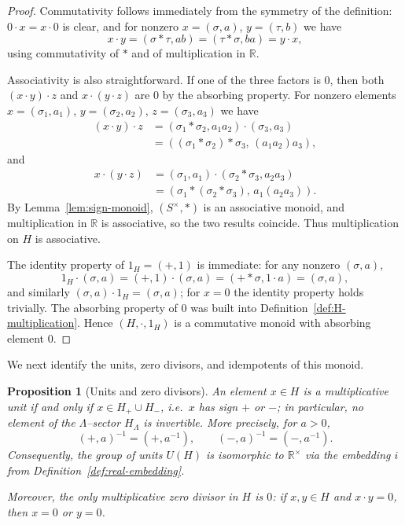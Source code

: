\documentclass[11pt]{amsart}
\numberwithin{equation}{section}
\newtheorem{proposition}[theorem]{Proposition}
\theoremstyle{definition}
\theoremstyle{remark}
\newcommand{\R}{\mathbb{R}}
\newcommand{\Hnum}{H}                      %
\newcommand{\Snon}{S^{\times}}             %
\newcommand{\iemb}{i}                      %
\newcommand{\idH}{1_H}
\begin{document}
\begin{proof}
Commutativity follows immediately from the symmetry of the definition:
$0\cdot x=x\cdot 0$ is clear, and for nonzero $x=(\sigma,a)$,
$y=(\tau,b)$ we have
\[
  x\cdot y = (\sigma*\tau,ab)
           = (\tau*\sigma,ba)
           = y\cdot x,
\]
using commutativity of $*$ and of multiplication in $\R$.

Associativity is also straightforward.  If one of the three factors is
$0$, then both $(x\cdot y)\cdot z$ and $x\cdot(y\cdot z)$ are $0$ by
the absorbing property.  For nonzero elements
$x=(\sigma_1,a_1)$, $y=(\sigma_2,a_2)$, $z=(\sigma_3,a_3)$ we have
\begin{align*}
  (x\cdot y)\cdot z
  &= (\sigma_1*\sigma_2,a_1a_2)\cdot(\sigma_3,a_3)\\
  &= ((\sigma_1*\sigma_2)*\sigma_3,\,(a_1a_2)a_3),
\end{align*}
and
\begin{align*}
  x\cdot(y\cdot z)
  &= (\sigma_1,a_1)\cdot(\sigma_2*\sigma_3,a_2a_3)\\
  &= (\sigma_1*(\sigma_2*\sigma_3),\,a_1(a_2a_3)).
\end{align*}
By Lemma~\ref{lem:sign-monoid}, $(\Snon,*)$ is an associative monoid,
and multiplication in $\R$ is associative, so the two results coincide.
Thus multiplication on $\Hnum$ is associative.

The identity property of $\idH=(+,1)$ is immediate: for any nonzero
$(\sigma,a)$,
\[
  \idH\cdot(\sigma,a)
  = (+,1)\cdot(\sigma,a)
  = (+*\sigma,1\cdot a)
  = (\sigma,a),
\]
and similarly $(\sigma,a)\cdot\idH=(\sigma,a)$; for $x=0$ the identity
property holds trivially.  The absorbing property of $0$ was built
into Definition~\ref{def:H-multiplication}.  Hence $(\Hnum,\cdot,\idH)$
is a commutative monoid with absorbing element $0$.
\end{proof}

We next identify the units, zero divisors, and idempotents of this
monoid.

\begin{proposition}[Units and zero divisors]\label{prop:H-units}
An element $x\in\Hnum$ is a multiplicative unit if and only if
$x\in H_+\cup H_-$, i.e.\ $x$ has sign $+$ or $-$; in particular, no
element of the $\Lambda$--sector $H_\Lambda$ is invertible.  More
precisely, for $a>0$,
\[
  (+,a)^{-1} = (+,a^{-1}),\qquad
  (-,a)^{-1} = (-,a^{-1}).
\]
Consequently, the group of units $U(\Hnum)$ is isomorphic to
$\R^\times$ via the embedding $\iemb$ from
Definition~\ref{def:real-embedding}.

Moreover, the only multiplicative zero divisor in $\Hnum$ is $0$:
if $x,y\in\Hnum$ and $x\cdot y=0$, then $x=0$ or $y=0$.
\end{proposition}
\end{document}
